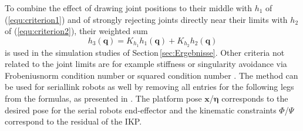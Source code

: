 \documentclass[robotics,article,accept,moreauthors,pdftex]{Definitions/mdpi}
\newcommand{\bm}[1]{\boldsymbol{#1}}
\let\Phi\varPhi
\let\Psi\varPsi
\begin{document}
To combine the effect of drawing joint positions to their middle with $h_1$ of (\ref{equ:criterion1}) and of strongly rejecting joints directly near their limits with $h_2$ of (\ref{equ:criterion2}), their weighted sum
%
\begin{equation}
h_3(\bm{q})
=
K_{h_1} h_1(\bm{q}) + K_{h_2} h_2(\bm{q})
\label{equ:criterion3}
\end{equation}
%
is used in the simulation studies of Section\,\ref{sec:Ergebnisse}.
%
Other criteria not related to the joint limits are for example stiffness \cite{GuoDonKe2015} or singularity avoidance via Frobenius\replaced[id=Sp]{ }{-}norm condition number \cite{ZhuQuCaoYan2013} or squared condition number \cite{LegerAng2016}.
The method can be used for serial\replaced[id=Sp]{-}{ }link robots as well by removing all entries for the following legs from the formulas, as presented in \cite{1_SchapplerTapOrt2019}.
The platform pose $\bm{x}$/$\bm{\eta}$ corresponds to the desired pose for the serial robots end-effector and the kinematic constraints $\bm{\Phi}$/$\bm{\Psi}$ correspond to the residual of the IKP.
\end{document}
